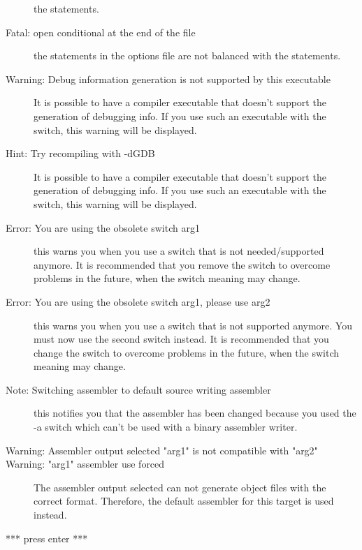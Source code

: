 \begin{description}
 the  statements.
\item [Fatal: open conditional at the end of the file]
 the  statements in the options file are not balanced with
 the  statements.
\item [Warning: Debug information generation is not supported by this executable]
 It is possible to have a compiler executable that doesn't support
 the generation of debugging info. If you use such an executable with the
  switch, this warning will be displayed.
\item [Hint: Try recompiling with -dGDB]
 It is possible to have a compiler executable that doesn't support
 the generation of debugging info. If you use such an executable with the
  switch, this warning will be displayed.
\item [Error: You are using the obsolete switch arg1]
 this warns you when you use a switch that is not needed/supported anymore.
 It is recommended that you remove the switch to overcome problems in the
 future, when the switch meaning may change.
\item [Error: You are using the obsolete switch arg1, please use arg2]
 this warns you when you use a switch that is not supported anymore. You
 must now use the second switch instead.
 It is recommended that you change the switch to overcome problems in the
 future, when the switch meaning may change.
\item [Note: Switching assembler to default source writing assembler]
 this notifies you that the assembler has been changed because you used the
 -a switch which can't be used with a binary assembler writer.
\item [Warning: Assembler output selected "arg1" is not compatible with "arg2"]
\item [Warning: "arg1" assembler use forced]
 The assembler output selected can not generate
 object files with the correct format. Therefore, the
 default assembler for this target is used instead.
\item [*** press enter ***]
\end{description}

